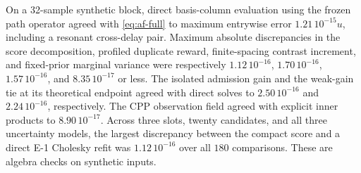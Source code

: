 \begin{afdmremark}
On a 32-sample synthetic block, direct basis-column evaluation using
the frozen path operator agreed with \eqref{eq:af-full} to maximum
entrywise error $1.21\,10^{-15}u$, including a resonant cross-delay
pair. Maximum absolute discrepancies in the score decomposition,
profiled duplicate reward, finite-spacing contrast increment, and
fixed-prior marginal variance were respectively
$1.12\,10^{-16}$, $1.70\,10^{-16}$, $1.57\,10^{-16}$, and
$8.35\,10^{-17}$ or less. The isolated admission gain and the
weak-gain tie at its theoretical endpoint agreed with direct solves
to $2.50\,10^{-16}$ and $2.24\,10^{-16}$, respectively. The CPP
observation field agreed with explicit inner products to
$8.90\,10^{-17}$. Across three slots, twenty candidates, and all
three uncertainty models, the largest discrepancy between the compact
score and a direct E-1 Cholesky refit was $1.12\,10^{-16}$ over all
$180$ comparisons. These are algebra checks on synthetic inputs.
\end{afdmremark}

